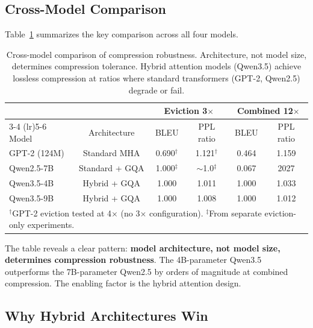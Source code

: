 \documentclass[11pt]{article}
\begin{document}
\subsection{Cross-Model Comparison}
\label{sec:cross_model}

Table~\ref{tab:cross_model} summarizes the key comparison across all four models.

\begin{table}[htbp]
\centering
\caption{Cross-model comparison of compression robustness.  Architecture, not model size, determines compression tolerance.  Hybrid attention models (Qwen3.5) achieve lossless compression at ratios where standard transformers (GPT-2, Qwen2.5) degrade or fail.}
\label{tab:cross_model}
\begin{tabular}{@{}lccccc@{}}
\toprule
& & \multicolumn{2}{c}{Eviction 3$\times$} & \multicolumn{2}{c}{Combined 12$\times$} \\
\cmidrule(lr){3-4} \cmidrule(lr){5-6}
Model & Architecture & BLEU & PPL ratio & BLEU & PPL ratio \\
\midrule
GPT-2 (124M) & Standard MHA & 0.690$^\dagger$ & 1.121$^\dagger$ & 0.464 & 1.159 \\
Qwen2.5-7B & Standard + GQA & 1.000$^\ddagger$ & $\sim$1.0$^\ddagger$ & 0.067 & 2027 \\
Qwen3.5-4B & Hybrid + GQA & 1.000 & 1.011 & 1.000 & 1.033 \\
Qwen3.5-9B & Hybrid + GQA & 1.000 & 1.008 & 1.000 & 1.012 \\
\bottomrule
\multicolumn{6}{l}{\footnotesize $^\dagger$GPT-2 eviction tested at 4$\times$ (no 3$\times$ configuration).  $^\ddagger$From separate eviction-only experiments.}
\end{tabular}
\end{table}

The table reveals a clear pattern: \textbf{model architecture, not model size, determines compression robustness}.  The 4B-parameter Qwen3.5 outperforms the 7B-parameter Qwen2.5 by orders of magnitude at combined compression.  The enabling factor is the hybrid attention design.

\subsection{Why Hybrid Architectures Win}
\label{sec:why_hybrid}
\end{document}
